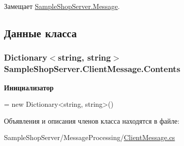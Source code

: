 Замещает \hyperlink{class_sample_shop_server_1_1_message_aff3ebefdc919f68c09fa9e0ee4834af2}{Sample\+Shop\+Server.\+Message}.



\subsection{Данные класса}
\hypertarget{class_sample_shop_server_1_1_client_message_a7694618ffe5b8168990bc0dacb4acc40}{}
\subsubsection[{Contents}]{\setlength{\rightskip}{0pt plus 5cm}Dictionary$<$string, string$>$ Sample\+Shop\+Server.\+Client\+Message.\+Contents}\label{class_sample_shop_server_1_1_client_message_a7694618ffe5b8168990bc0dacb4acc40}
{\bfseries Инициализатор}
\begin{DoxyCode}
=
                        \textcolor{keyword}{new} Dictionary<string, string>()
\end{DoxyCode}


Объявления и описания членов класса находятся в файле\+:\begin{DoxyCompactItemize}
\item 
Sample\+Shop\+Server/\+Message\+Processing/\hyperlink{_client_message_8cs}{Client\+Message.\+cs}\end{DoxyCompactItemize}
